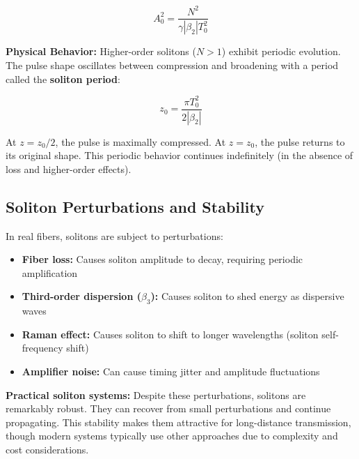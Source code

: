 \documentclass[a4paper, 11pt]{article}
\begin{document}
\begin{equation}
    A_0^2 = \frac{N^2}{\gamma |\beta_2| T_0^2}
\end{equation}

\begin{physical}
\textbf{Physical Behavior:} Higher-order solitons ($N > 1$) exhibit periodic evolution. The pulse shape oscillates between compression and broadening with a period called the \textbf{soliton period}:

\begin{equation}
    z_0 = \frac{\pi T_0^2}{2|\beta_2|}
\end{equation}

At $z = z_0/2$, the pulse is maximally compressed. At $z = z_0$, the pulse returns to its original shape. This periodic behavior continues indefinitely (in the absence of loss and higher-order effects).
\end{physical}

\subsection{Soliton Perturbations and Stability}

In real fibers, solitons are subject to perturbations:

\begin{itemize}[leftmargin=*]
    \item \textbf{Fiber loss:} Causes soliton amplitude to decay, requiring periodic amplification
    \item \textbf{Third-order dispersion ($\beta_3$):} Causes soliton to shed energy as dispersive waves
    \item \textbf{Raman effect:} Causes soliton to shift to longer wavelengths (soliton self-frequency shift)
    \item \textbf{Amplifier noise:} Can cause timing jitter and amplitude fluctuations
\end{itemize}

\begin{physical}
\textbf{Practical soliton systems:} Despite these perturbations, solitons are remarkably robust. They can recover from small perturbations and continue propagating. This stability makes them attractive for long-distance transmission, though modern systems typically use other approaches due to complexity and cost considerations.
\end{physical}

\end{document}
